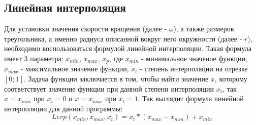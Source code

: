 \documentclass[14pt]{extarticle}
\begin{document}
{\begin{spacing}{1.5}
{        \subsection{Линейная интерполяция}
        \label{sec:lerp}
        \par
    }
    Для установки значения скорости вращения (далее - $\omega$), а также размеров треугольника, а именно радиуса описанной вокруг него окружности (далее - $r$), необходимо воспользоваться формулой линейной интерполяции. Такая формула имеет 3 параметра: $x_{min}$, $x_{max}$, $x_p$, где $x_{min}$ - минимальное значение функции, $x_{max}$ - максимальное значение функции, $x_t$ - степень интерполяции на отрезке $[0; 1]$. Задача функции заключается в том, чтобы найти значение $x$, которому соответствует значение функции при данной степени интерполяции $x_t$, так $x = x_{min}$ при $x_t=0$ и $x = x_{max}$ при $x_t=1$. Так выглядит формула линейной интерполяции для данной программы:
    \[
    Lerp(x_{min}, x_{max}, x_t) = x_t * (x_{max} - x_{min}) + x_{min}
    \]
    {
        \par
}
\end{spacing}}
\end{document}
